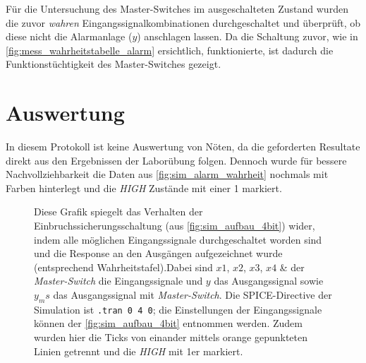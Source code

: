 \documentclass[12pt,english,ngerman]{scrartcl}
\begin{document}
Für die Untersuchung des Master-Switches im ausgeschalteten Zustand wurden die
zuvor \textit{wahren} Eingangssignalkombinationen durchgeschaltet und überprüft, ob diese
nicht die Alarmanlage ($y$) anschlagen lassen. Da die Schaltung zuvor, wie in
\autoref{fig:mess_wahrheitstabelle_alarm} ersichtlich, funktionierte, ist
dadurch die Funktionstüchtigkeit des Master-Switches gezeigt.


\section{Auswertung}\label{sec:Auswertung}
In diesem Protokoll ist keine Auswertung von Nöten, da die geforderten Resultate
direkt aus den Ergebnissen der Laborübung folgen. Dennoch wurde für bessere 
Nachvollziehbarkeit die Daten aus \autoref{fig:sim_alarm_wahrheit} nochmals mit Farben
hinterlegt und die \textit{HIGH} Zustände mit einer 1 markiert. 

\begin{figure}[H]
  \centering
  \caption{Diese Grafik spiegelt das Verhalten der
    Einbruchssicherungsschaltung (aus \autoref{fig:sim_aufbau_4bit}) wider, indem alle
    möglichen Eingangssignale durchgeschaltet worden sind und die Response an den
    Ausgängen aufgezeichnet wurde (entsprechend Wahrheitstafel).Dabei sind $x1$, $x2$, $x3$, $x4$ \&
    der \textit{Master-Switch} die Eingangssignale und $y$ das Ausgangssignal sowie $y_ms$
    das Ausgangssignal mit \textit{Master-Switch}. Die
    SPICE-Directive der Simulation ist \texttt{.tran 0 4 0}; die
    Einstellungen der Eingangssignale können der \autoref{fig:sim_aufbau_4bit}
  entnommen werden. Zudem wurden hier die Ticks von einander mittels orange gepunkteten Linien getrennt und die \textit{HIGH} mit 1er markiert.}
  \label{fig:sim_alarm_wahrheit_aus}
\end{figure}
\end{document}
